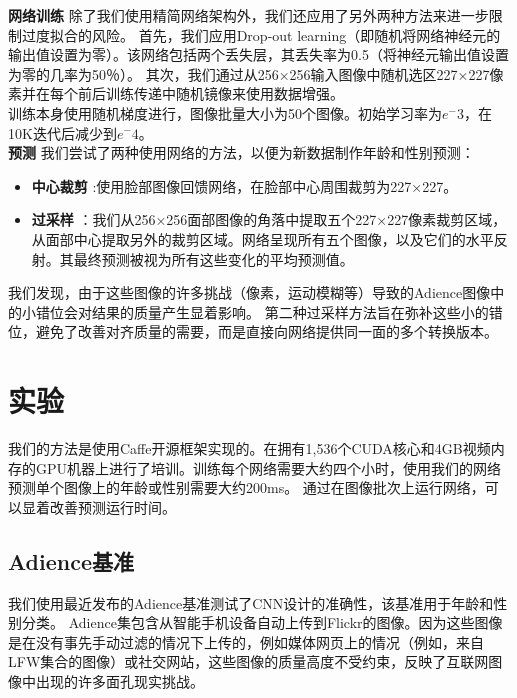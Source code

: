 \documentclass{article}
\begin{document}
\textbf{网络训练}
除了我们使用精简网络架构外，我们还应用了另外两种方法来进一步限制过度拟合的风险。
首先，我们应用Drop-out learning（即随机将网络神经元的输出值设置为零）。该网络包括两个丢失层，其丢失率为0.5（将神经元输出值设置为零的几率为50％）。
其次，我们通过从256×256输入图像中随机选区227×227像素并在每个前后训练传递中随机镜像来使用数据增强。\\

训练本身使用随机梯度进行，图像批量大小为50个图像。初始学习率为$e^-3$，在10K迭代后减少到$e^-4$。\\

\textbf{预测}
我们尝试了两种使用网络的方法，以便为新数据制作年龄和性别预测：\\
\begin{itemize}
    \item \textbf{中心裁剪} :使用脸部图像回馈网络，在脸部中心周围裁剪为227×227。\\
    \item \textbf{过采样} ：我们从256×256面部图像的角落中提取五个227×227像素裁剪区域，从面部中心提取另外的裁剪区域。网络呈现所有五个图像，以及它们的水平反射。其最终预测被视为所有这些变化的平均预测值。\\
\end{itemize}

我们发现，由于这些图像的许多挑战（像素，运动模糊等）导致的Adience图像中的小错位会对结果的质量产生显着影响。
第二种过采样方法旨在弥补这些小的错位，避免了改善对齐质量的需要，而是直接向网络提供同一面的多个转换版本。\\

\section{实验}
我们的方法是使用Caffe开源框架实现的。在拥有1,536个CUDA核心和4GB视频内存的GPU机器上进行了培训。训练每个网络需要大约四个小时，使用我们的网络预测单个图像上的年龄或性别需要大约200ms。
通过在图像批次上运行网络，可以显着改善预测运行时间。\\

\subsection{Adience基准}
我们使用最近发布的Adience基准测试了CNN设计的准确性，该基准用于年龄和性别分类。
Adience集包含从智能手机设备自动上传到Flickr的图像。因为这些图像是在没有事先手动过滤的情况下上传的，例如媒体网页上的情况（例如，来自LFW集合的图像）或社交网站，这些图像的质量高度不受约束，反映了互联网图像中出现的许多面孔现实挑战。\\
\end{document}
